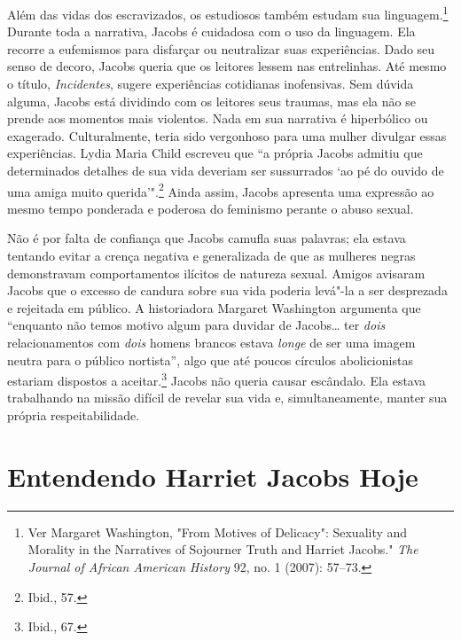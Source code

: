 Além das vidas dos escravizados, os estudiosos também estudam sua
linguagem.\footnote{Ver Margaret Washington, "From Motives of Delicacy":
  Sexuality and Morality in the Narratives of Sojourner Truth and
  Harriet Jacobs." \emph{The Journal of African American History} 92,
  no. 1 (2007): 57--73.} Durante toda a narrativa, Jacobs é cuidadosa com
o uso da linguagem. Ela recorre a eufemismos para disfarçar ou
neutralizar suas experiências. Dado seu senso de decoro, Jacobs queria
que os leitores lessem nas entrelinhas. Até mesmo o título,
\emph{Incidentes}, sugere experiências cotidianas inofensivas. Sem
dúvida alguma, Jacobs está dividindo com os leitores seus traumas, mas
ela não se prende aos momentos mais violentos. Nada em sua narrativa é
hiperbólico ou exagerado. Culturalmente, teria sido vergonhoso para uma
mulher divulgar essas experiências. Lydia Maria Child escreveu que ``a
própria Jacobs admitiu que determinados detalhes de sua vida deveriam
ser sussurrados `ao pé do ouvido de uma amiga muito
querida'".\footnote{Ibid., 57.} Ainda assim, Jacobs apresenta uma
expressão ao mesmo tempo ponderada e poderosa do feminismo perante o
abuso sexual.

Não é por falta de confiança que Jacobs camufla suas palavras; ela
estava tentando evitar a crença negativa e generalizada de que as
mulheres negras demonstravam comportamentos ilícitos de natureza sexual.
Amigos avisaram Jacobs que o excesso de candura sobre sua vida poderia
levá"-la a ser desprezada e rejeitada em público. A historiadora Margaret
Washington argumenta que ``enquanto não temos motivo algum para duvidar
de Jacobs\ldots{} ter \emph{dois} relacionamentos com \emph{dois} homens
brancos estava \emph{longe} de ser uma imagem neutra para o público
nortista'', algo que até poucos círculos abolicionistas estariam
dispostos a aceitar.\footnote{Ibid., 67.} Jacobs não queria causar
escândalo. Ela estava trabalhando na missão difícil de revelar sua vida
e, simultaneamente, manter sua própria respeitabilidade.


\section{Entendendo Harriet Jacobs Hoje}

